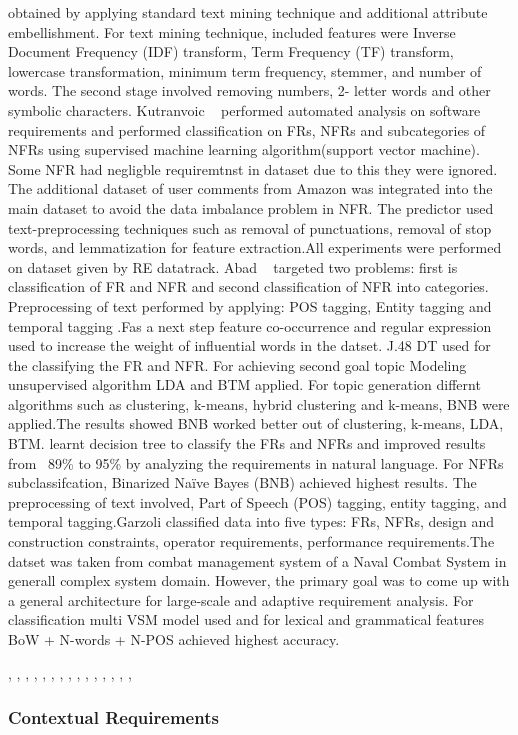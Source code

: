 obtained by applying standard text mining technique and additional attribute
embellishment. For text mining technique, included features were Inverse
Document Frequency (IDF) transform, Term Frequency (TF) transform, lowercase
transformation, minimum term frequency, stemmer, and number of words. The second
stage involved removing numbers, 2- letter words and other symbolic characters.
Kutranvoic \etal ~ \cite {Kurtanovic:2017}performed automated analysis on
software requirements and performed classification on FRs, NFRs and
subcategories of NFRs using supervised machine learning algorithm(support vector
machine). Some NFR had negligble requiremtnst in dataset due to this they were
ignored. The additional dataset of user comments from Amazon was integrated into
the main dataset to avoid the data imbalance problem in NFR. The predictor used
text-preprocessing techniques such as removal of punctuations, removal of stop
words, and lemmatization for feature extraction.All experiments were performed
on dataset given by RE datatrack.
 Abad \etal ~ \cite{Abad:2017} targeted two problems: first is classification of 
 FR and NFR and second classification of NFR into categories. Preprocessing of
 text performed by applying: POS tagging, Entity tagging and temporal tagging
 .Fas a next step feature co-occurrence and regular expression used to increase
 the weight of influential words in the datset. J.48 DT used for the classifying
 the FR and NFR. For achieving second goal topic Modeling unsupervised algorithm
 LDA and BTM applied. For topic generation differnt algorithms such as
 clustering, k-means, hybrid clustering and k-means, BNB were applied.The
 results showed BNB worked better out of clustering, k-means, LDA, BTM.
learnt decision tree to classify the FRs and NFRs and improved results from
~89\% to 95\% by analyzing the requirements in natural language. For NFRs
subclassifcation, Binarized Naïve Bayes (BNB) achieved highest results. The
preprocessing of text involved, Part of Speech (POS) tagging, entity tagging,
and temporal tagging.Garzoli \cite {Garzoli:2013} classified data into five
types: FRs, NFRs, design and construction constraints, operator requirements,
performance requirements.The datset was taken from combat management system of a
Naval Combat System in generall complex system domain. However, the primary goal
was to come up with a general architecture for large-scale and adaptive
requirement analysis. For classification multi VSM model used and for lexical
and grammatical features BoW + N-words + N-POS achieved highest accuracy.


\cite{Deocadez:2017}, \cite{Kurtanovic:2017}, \cite{Guzman:2017},
\cite{Abad:2017}, \cite{Dekhtyar:2017}, \cite{Rashwan:2012}, \cite{Lu:2017},
\cite{Hayes:2014}, \cite{Williams:2017}, \cite{Garzoli:2013},
\cite{Casamayor:2010}, \cite{Wang:2016}, \cite{Hussain:2012}, \cite{Jiang:2014},
\cite{Jha:2017}, \cite{Pinquie:2015}



\subsubsection{Contextual Requirements} 

